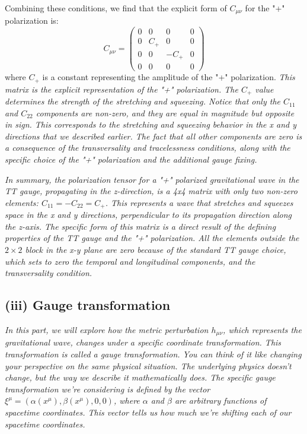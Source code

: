 Combining these conditions, we find that the explicit form of $C_{\mu \nu}$ for the "+" polarization is:
\begin{equation}
C_{\mu \nu} = \begin{pmatrix}
0 & 0 & 0 & 0 \\
0 & C_{+} & 0 & 0 \\
0 & 0 & -C_{+} & 0 \\
0 & 0 & 0 & 0
\end{pmatrix}
\end{equation}
where $C_{+}$ is a constant representing the amplitude of the "+" polarization. \emph{This matrix is the explicit representation of the "+" polarization. The $C_{+}$ value determines the strength of the stretching and squeezing. Notice that only the $C_{11}$ and $C_{22}$ components are non-zero, and they are equal in magnitude but opposite in sign. This corresponds to the stretching and squeezing behavior in the x and y directions that we described earlier. The fact that all other components are zero is a consequence of the transversality and tracelessness conditions, along with the specific choice of the "+" polarization and the additional gauge fixing.}

\emph{In summary, the polarization tensor for a "+" polarized gravitational wave in the TT gauge, propagating in the z-direction, is a 4x4 matrix with only two non-zero elements: $C_{11} = -C_{22} = C_{+}$. This represents a wave that stretches and squeezes space in the x and y directions, perpendicular to its propagation direction along the z-axis. The specific form of this matrix is a direct result of the defining properties of the TT gauge and the "+" polarization. All the elements outside the $2\times2$ block in the x-y plane are zero because of the standard TT gauge choice, which sets to zero the temporal and longitudinal components, and the transversality condition.}

\subsection*{(iii) Gauge transformation}

\emph{In this part, we will explore how the metric perturbation $h_{\mu\nu}$, which represents the gravitational wave, changes under a specific coordinate transformation. This transformation is called a gauge transformation. You can think of it like changing your perspective on the same physical situation. The underlying physics doesn't change, but the way we describe it mathematically does. The specific gauge transformation we're considering is defined by the vector $\xi^{\mu} = (\alpha(x^{\mu}), \beta(x^{\mu}), 0, 0)$, where $\alpha$ and $\beta$ are arbitrary functions of spacetime coordinates. This vector tells us how much we're shifting each of our spacetime coordinates.}

